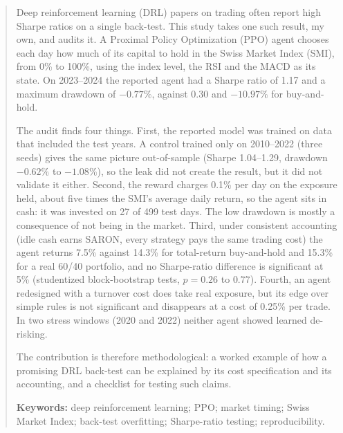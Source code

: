\documentclass[11pt,a4paper]{article}
\begin{document}
\begin{abstract}
\noindent
Deep reinforcement learning (DRL) papers on trading often report high Sharpe ratios on a single back-test. This study takes one such result, my own, and audits it. A Proximal Policy Optimization (PPO) agent chooses each day how much of its capital to hold in the Swiss Market Index (SMI), from 0\% to 100\%, using the index level, the RSI and the MACD as its state. On 2023--2024 the reported agent had a Sharpe ratio of 1.17 and a maximum drawdown of $-0.77\%$, against 0.30 and $-10.97\%$ for buy-and-hold.

The audit finds four things. First, the reported model was trained on data that included the test years. A control trained only on 2010--2022 (three seeds) gives the same picture out-of-sample (Sharpe 1.04--1.29, drawdown $-0.62\%$ to $-1.08\%$), so the leak did not create the result, but it did not validate it either. Second, the reward charges 0.1\% per day on the exposure held, about five times the SMI's average daily return, so the agent sits in cash: it was invested on 27 of 499 test days. The low drawdown is mostly a consequence of not being in the market. Third, under consistent accounting (idle cash earns SARON, every strategy pays the same trading cost) the agent returns 7.5\% against 14.3\% for total-return buy-and-hold and 15.3\% for a real 60/40 portfolio, and no Sharpe-ratio difference is significant at 5\% (studentized block-bootstrap tests, $p=0.26$ to $0.77$). Fourth, an agent redesigned with a turnover cost does take real exposure, but its edge over simple rules is not significant and disappears at a cost of 0.25\% per trade. In two stress windows (2020 and 2022) neither agent showed learned de-risking.

The contribution is therefore methodological: a worked example of how a promising DRL back-test can be explained by its cost specification and its accounting, and a checklist for testing such claims.

\medskip
\noindent\textbf{Keywords:} deep reinforcement learning; PPO; market timing; Swiss Market Index; back-test overfitting; Sharpe-ratio testing; reproducibility.
\end{abstract}
\end{document}
